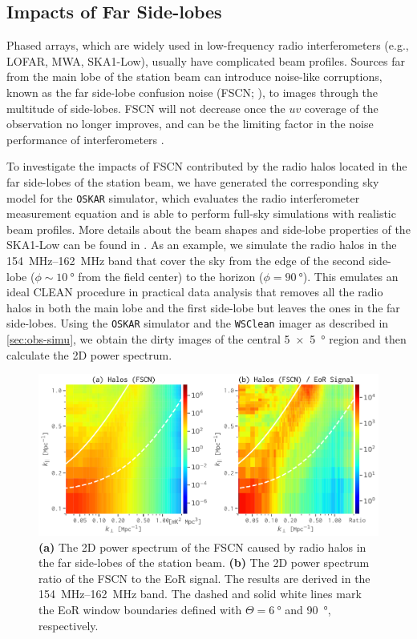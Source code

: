\documentclass[twocolumn]{aastex62}
\begin{document}
\subsection{Impacts of Far Side-lobes}
\label{sec:far-sidelobes}

Phased arrays, which are widely used in low-frequency radio
interferometers (e.g., LOFAR, MWA, SKA1-Low), usually have complicated
beam profiles.
Sources far from the main lobe of the station beam can introduce
noise-like corruptions, known as the far side-lobe confusion noise
(FSCN; \citealt{smirnov2012}), to images through the multitude of
side-lobes.
FSCN will not decrease once the $uv$ coverage of the observation no
longer improves, and can be the limiting factor in the noise
performance of interferometers \citep{mort2017}.

To investigate the impacts of FSCN contributed by the radio halos
located in the far side-lobes of the station beam, we have generated
the corresponding sky model for the \texttt{OSKAR} simulator,
which evaluates the radio interferometer measurement equation
\citep{smirnov2011} and is able to perform full-sky simulations with
realistic beam profiles.
More details about the beam shapes and side-lobe properties of the
SKA1-Low can be found in \citet{mort2017}.
As an example, we simulate the radio halos in the \SIrange{154}{162}{\MHz}
band that cover the sky from the edge of the second side-lobe
($\phi \sim \SI{10}{\degree}$ from the field center) to the horizon
($\phi = \SI{90}{\degree}$).
This emulates an ideal CLEAN procedure in practical data analysis that
removes all the radio halos in both the main lobe and the first side-lobe
but leaves the ones in the far side-lobes.
Using the \texttt{OSKAR} simulator and the \texttt{WSClean} imager as
described in \autoref{sec:obs-simu}, we obtain the dirty images of the
central \SI[product-units=repeat]{5 x 5}{\degree} region and then
calculate the 2D power spectrum.

\begin{figure}
  \centering
  \includegraphics[width=\textwidth]{ps2d-fscn-band158}
  \caption{\label{fig:ps2d-fscn}%
    \textbf{(a)} The 2D power spectrum of the FSCN caused by radio halos
    in the far side-lobes of the station beam.
    \textbf{(b)} The 2D power spectrum ratio of the FSCN to the EoR signal.
    The results are derived in the \SIrange{154}{162}{\MHz} band.
    The dashed and solid white lines mark the EoR window boundaries
    defined with $\Theta = \SI{6}{\degree}$ and \SI{90}{\degree},
    respectively.
  }
\end{figure}
\end{document}
